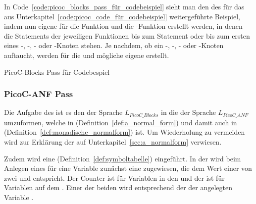 In Code~\ref{code:picoc_blocks_pass_für_codebeispiel} sieht man den  des  für das aus Unterkapitel~\ref{code:picoc_code_für_codebeispiel} weitergeführte Beispiel, indem nun eigene  für die Funktion  und die -Funktion erstellt werden, in denen die  Statements der jeweiligen Funktionen bis zum  Statement oder bis zum ersten  eines -, -, - oder -Knoten stehen. Je nachdem, ob ein -, -, - oder -Knoten auftaucht, werden für die  und mögliche  eigene  erstellt.

\begin{code}
  \centering
  \caption{PicoC-Blocks Pass für Codebespiel}
  \label{code:picoc_blocks_pass_für_codebeispiel}
\end{code}

\subsubsection{PicoC-ANF Pass}
\label{picoc_mon_pass}

\label{sec:picoc_mon_pass_zweck}

Die Aufgabe des  ist es den  der Sprache $L_{PicoC\_Blocks}$ in die  der Sprache $L_{PicoC\_ANF}$ umzuformen, welche in  (Definition~\ref{def:a_normal_form}) und damit auch in  (Definition~\ref{def:monadische_normalform}) ist. Um Wiederholung zu vermeiden wird zur Erklärung der  auf Unterkapitel~\ref{sec:a_normalform} verwiesen.

Zudem wird eine  (Definition~\ref{def:symboltabelle}) eingeführt. In der  wird beim Anlegen eines  für eine Variable zunächst eine  zugewiesen, die dem Wert einer von zwei    und   entspricht. Der Counter  ist für Variablen in den  und der    ist für Variablen auf dem . Einer der beiden  wird entsprechend der  der angelegten Variable .

